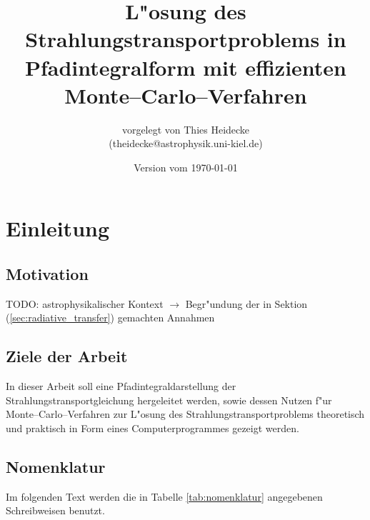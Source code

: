 \documentclass[11pt,a4paper,DIVcalc,BCOR8mm,titlepage,twoside]{scrartcl}
\begin{document}
	\titlehead{Christian--Albrechts--Universit"at zu Kiel\\ Institut f"ur Theoretische Physik und Astrophysik}
	\subject{Diplomarbeit}
	\title{L"osung des Strahlungstransportproblems in Pfadintegralform mit effizienten Monte--Carlo--Verfahren}
	\author{vorgelegt von Thies Heidecke\\(theidecke@astrophysik.uni-kiel.de)}
	\publishers{betreut durch Prof. Sebastian Wolf}
	\date{Version vom \today}
	\maketitle

	\tableofcontents
	\vfill
	\pagebreak
	
	\newcommand{\location}[1]{\mathbf{#1}}
	\newcommand{\scatter}[1]{\overset{#1}{\leftrightsquigarrow}}
	\newcommand{\normalized}[1]{\frac{#1}{||#1||}}
	
	\section{Einleitung}
	\subsection{Motivation}
	TODO: astrophysikalischer Kontext $\rightarrow$ Begr"undung der in Sektion (\ref{sec:radiative_transfer}) gemachten Annahmen
	\subsection{Ziele der Arbeit}
	In dieser Arbeit soll eine Pfadintegraldarstellung der Strahlungstransportgleichung hergeleitet werden, sowie dessen Nutzen f"ur Monte--Carlo--Verfahren zur L"osung des Strahlungstransportproblems theoretisch und praktisch in Form eines Computerprogrammes gezeigt werden.
	
	\subsection{Nomenklatur}\label{subsec:nomenklatur}
	Im folgenden Text werden die in Tabelle \ref{tab:nomenklatur} angegebenen Schreibweisen benutzt.
\end{document}
